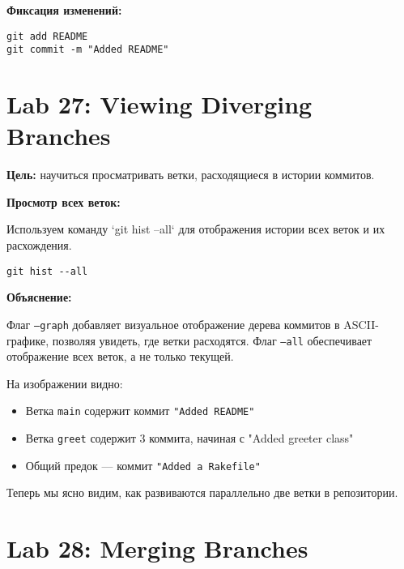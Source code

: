 \documentclass[a4paper,12pt]{report}
\begin{document}
\textbf{Фиксация изменений:}
\begin{verbatim}
git add README
git commit -m "Added README"
\end{verbatim}


\section{Lab 27: Viewing Diverging Branches}

\textbf{Цель:} научиться просматривать ветки, расходящиеся в истории коммитов.

\textbf{Просмотр всех веток:}

Используем команду `git hist --all` для отображения истории всех веток и их расхождения.

\begin{verbatim}
git hist --all
\end{verbatim}


\textbf{Объяснение:}

Флаг \texttt{--graph} добавляет визуальное отображение дерева коммитов в ASCII-графике, позволяя увидеть, где ветки расходятся. Флаг \texttt{--all} обеспечивает отображение всех веток, а не только текущей.

На изображении видно:

\begin{itemize}
  \item Ветка \texttt{main} содержит коммит \texttt{"Added README"}
  \item Ветка \texttt{greet} содержит 3 коммита, начиная с "Added greeter class"
  \item Общий предок — коммит \texttt{"Added a Rakefile"}
\end{itemize}

Теперь мы ясно видим, как развиваются параллельно две ветки в репозитории.

\section{Lab 28: Merging Branches}
\end{document}
